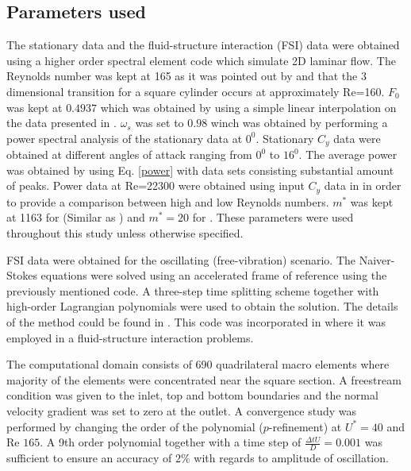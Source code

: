  
 \vspace{20mm}
 
 
\subsection{Parameters used} 
 
The stationary data and the fluid-structure interaction (FSI) data were obtained using a higher order spectral element code which simulate 2D laminar flow. The Reynolds number was kept at 165 as it was pointed out by \cite{Sheard2009} and \cite{Tong2008} that the 3 dimensional transition for a square cylinder occurs at approximately Re=160. $F_0$ was kept at $0.4937$ which was obtained by using a simple linear interpolation on the data presented in \cite{Joly2012}. $\omega_s$ was set to $0.98$ winch was obtained by performing a power spectral analysis of the stationary data at $0^0$. Stationary $C_y$ data were obtained at different angles of attack ranging from $0^0$ to $16^0$. The average power was obtained by using Eq. \eqref{power} with data sets consisting substantial amount of peaks. Power data  at Re=22300 were obtained using input $C_y$ data in \cite{Parkinson1964} in order to provide a comparison between high and low Reynolds numbers. $m^*$ was kept at 1163 for  (Similar as \cite{Parkinson1964}) and $m^*=20$ for . These parameters  were used throughout this study unless otherwise specified. 


 FSI data were obtained for the oscillating (free-vibration) scenario. The Naiver-Stokes equations were solved using an accelerated frame of reference using the previously mentioned code. A three-step time splitting scheme together with high-order Lagrangian polynomials were used to obtain the solution. The details of the method could be found in \cite{Thompson2006,Thompson1996a}. This code was incorporated in \cite{Leontini2011,Leontini2007a}  where it was employed in a fluid-structure interaction problems. 
 
 The computational domain consists of 690 quadrilateral macro elements where majority of the elements were concentrated near the square section. A freestream condition was given to the inlet, top and bottom boundaries and the normal velocity gradient was set to zero at the outlet. A convergence study was performed by changing the order of the polynomial ($p$-refinement) at $U^*=40$ and Re $165$. A 9th order polynomial together with a time step of $\frac{\Delta tU}{D}=0.001$ was sufficient to ensure an accuracy of $2\%$ with regards to amplitude of oscillation.  
 

 
 
 

 
 
 
 









